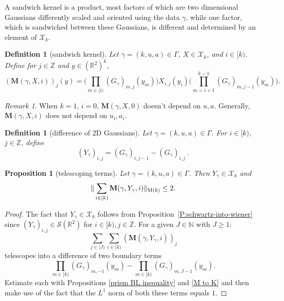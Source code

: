 \documentclass[12pt,reqno]{amsart}
\theoremstyle{plain}
\newtheorem{proposition}[theorem]{Proposition}
\newtheorem{definition}[theorem]{Definition}
\numberwithin{equation}{section}
\theoremstyle{remark}
\newtheorem{rem}{Remark}[section]
\newcommand{\uses}[1]{}
\newcommand{\usesdefs}[1]{}
\newcommand{\Z}{{\mathbb Z}}
\newcommand{\R}{{\mathbb R}}
\newcommand{\N}{{\mathbb N}}
\newcommand{\M}{\mathbf{M}}
\begin{document}
A sandwich kernel is a product, most factors of which are two dimensional Gaussians differently scaled and oriented
using the data $\gamma$, while one
factor, which is  sandwiched between these Gaussians, is different and determined by an element of $\mathcal{X}_k$.
\begin{definition}[sandwich kernel]\label{sandwich kernel}\uses{}\usesdefs{geometric parameters,double sequence of 2D functions,2D Gaussians}
Let $\gamma=(k,u,a)\in \Gamma$, $X\in \mathcal{X}_k$, and $i\in [k)$. Define for  $j\in \Z$ and $y\in (\R^{2})^k$,
\begin{equation}\label{auto:sandwich-kernel-definition} (\M(\gamma,X,i))_j(y) =  \Big(\prod_{m\in [i)} (G_{\gamma})_{m,j}(y_m) \Big) X_{i,j}(y_i) \Big(\prod_{m=i+1}^{k-1} (G_{\gamma})_{m,j-1}(y_m) \Big).\end{equation}
\end{definition}

\begin{rem}
When $k=1$, $i=0$, $\M(\gamma,X,0)$ doesn't depend on $u,a$.
Generally, $\M(\gamma,X,i)$ does not depend on $u_i, a_i$.
\end{rem}

\begin{definition}[difference of 2D Gaussians]\label{auto:Gaussian-difference-kernel-definition}\uses{}\usesdefs{geometric parameters,2D Gaussians}
Let $\gamma=(k,u,a)\in \Gamma$.  For $i\in [k)$, $j\in \Z$, define
\begin{equation}\label{auto:Gaussian-difference-kernel} (Y_\gamma)_{i,j} = (G_\gamma)_{i,j-1} - (G_\gamma)_{i,j}\ .\end{equation}
\end{definition}

\begin{proposition}[telescoping terms]\label{telescoping terms}\uses{P:schwartz-into-wiener,prism BL inequality,M to K}\usesdefs{geometric parameters,double sequence of 2D functions,kernel sequences,2D Gaussians,sandwich kernel,auto:Gaussian-difference-kernel-definition}
Let $\gamma=(k,u,a)\in \Gamma$.
Then $Y_\gamma\in \mathcal{X}_k$ and
\begin{equation}\label{auto:telescoping-terms-bound}
    \|\sum_{i\in [k)} \M(\gamma,Y_\gamma,i)\|_{{\rm M}(k)}\le 2.
\end{equation}
\end{proposition}

\begin{proof}
The fact that $Y_\gamma\in \mathcal{X}_k$ follows from Proposition~\ref{P:schwartz-into-wiener} since $(Y_\gamma)_{i,j}\in \mathcal S(\R^2)$ for $i\in [k), j\in \Z$.
For a given $J\in\N$ with $J\ge1$:
\[
\sum_{j\in [J)} \sum_{i\in [k)} (\M(\gamma,Y_\gamma,i))_j
\]
telescopes into a difference of two boundary terms
\[
\prod_{m\in [k)} (G_{\gamma})_{m,-1}(y_m) -\prod_{m\in [k)} (G_{\gamma})_{m,J-1}(y_m).
\]
Estimate each with Propositions \ref{prism BL inequality} and \ref{M to K} and then make use of the fact that the $L^1$ norm of both these terms equals $1$.
\end{proof}
\end{document}
